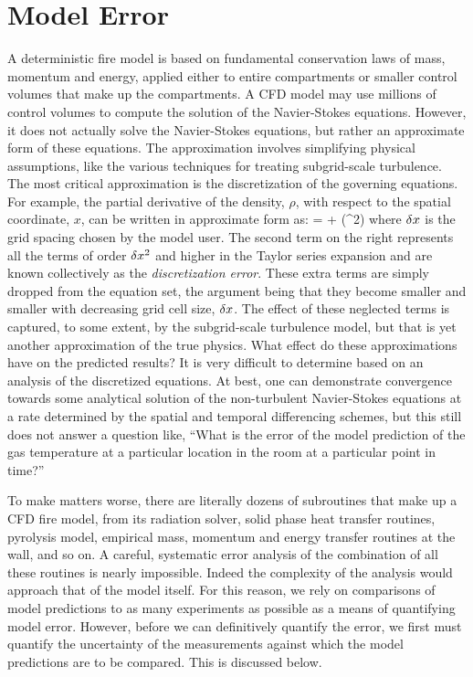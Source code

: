 \section{Model Error}

A deterministic fire model is based on fundamental conservation laws of mass, momentum and energy, applied either to entire compartments or smaller control
volumes that make up the compartments. A CFD model may use millions of control volumes to compute the solution of the Navier-Stokes equations.
However, it does not actually solve the Navier-Stokes equations, but rather an approximate form of these equations. The approximation involves simplifying
physical assumptions, like the various techniques for treating subgrid-scale turbulence.
The most critical approximation is the discretization of the governing equations. For example, the partial derivative of the density, $\rho$,
with respect to the spatial coordinate, $x$, can be written in approximate form as:
\be {} =  + (\dx^2) \ee
where $\delta x$ is the grid spacing chosen by the model user.
The second term on the right represents all the terms of order $\delta x^2$ and higher in the Taylor series expansion and are known collectively as the
{\em discretization error}. These extra terms are simply dropped from
the equation set, the argument being that they become smaller and smaller with decreasing grid cell size, $\delta x$. The effect of these neglected terms is captured, to
some extent, by the subgrid-scale turbulence model, but that is yet another approximation of the true physics. What effect do these approximations have on
the predicted results? It is very difficult to determine based on an analysis of the discretized equations. At best, one can demonstrate convergence towards some
analytical solution of the non-turbulent Navier-Stokes equations at a rate determined by the spatial and temporal differencing schemes, but this still does not answer a
question like, ``What is the error of the model prediction of the gas temperature at a particular location in the room at a particular point in time?''

To make matters worse, there are literally dozens of subroutines that make up a CFD fire model, from its radiation solver, solid phase heat transfer routines, pyrolysis model,
empirical mass, momentum and energy transfer routines at the wall, and so on. A careful, systematic error analysis of the combination of all these routines is
nearly impossible. Indeed the complexity of the analysis would approach that of the model itself. For this reason, we rely on comparisons of model predictions to as many
experiments as possible as a means of quantifying model error. However, before we can definitively quantify the error, we first must quantify the uncertainty of the
measurements against which the model predictions are to be compared. This is discussed below.


